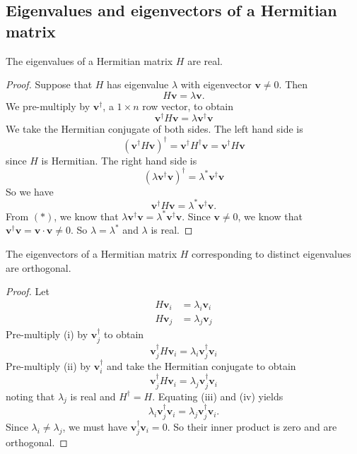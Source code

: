 \documentclass[a4paper]{article}
\begin{document}
      \subsection{Eigenvalues and eigenvectors of a Hermitian matrix}
      \begin{thm}
        The eigenvalues of a Hermitian matrix $H$ are real.
      \end{thm}

      \begin{proof}
        Suppose that $H$ has eigenvalue $\lambda$ with eigenvector $\mathbf{v}\not= 0$. Then
        \[
          H\mathbf{v} = \lambda\mathbf{v}.
        \]
        We pre-multiply by $\mathbf{v}^\dagger$, a $1\times n$ row vector, to obtain
        \[
        \mathbf{v}^\dagger H\mathbf{v} = \lambda \mathbf{v}^\dagger \mathbf{v}\tag{$*$}\]
        We take the Hermitian conjugate of both sides. The left hand side is
        \[
          (\mathbf{v}^\dagger H\mathbf{v})^\dagger = \mathbf{v}^\dagger H^\dagger \mathbf{v} = \mathbf{v}^\dagger H \mathbf{v}
        \]
        since $H$ is Hermitian. The right hand side is
        \[
          (\lambda\mathbf{v}^\dagger\mathbf{v})^\dagger = \lambda^* \mathbf{v}^\dagger \mathbf{v}
        \]
        So we have
        \[
          \mathbf{v}^\dagger H\mathbf{v} = \lambda^* \mathbf{v}^\dagger \mathbf{v}.
        \]
        From $(*)$, we know that $\lambda \mathbf{v}^\dagger \mathbf{v} = \lambda^* \mathbf{v}^\dagger \mathbf{v}$. Since $\mathbf{v} \not= 0$, we know that $\mathbf{v}^\dagger \mathbf{v} = \mathbf{v}\cdot \mathbf{v} \not =0$. So $\lambda = \lambda^*$ and $\lambda$ is real.
      \end{proof}

      \begin{thm}
        The eigenvectors of a Hermitian matrix $H$ corresponding to distinct eigenvalues are orthogonal. 
      \end{thm}

      \begin{proof}
        Let
        \begin{align*}
          H\mathbf{v}_i &= \lambda_i\mathbf{v}_i\tag{i}\\
          H\mathbf{v}_j &= \lambda_j\mathbf{v}_j\tag{ii}
        \end{align*}
        Pre-multiply (i) by $\mathbf{v}_j^\dagger$ to obtain
        \[
          \mathbf{v}_j^\dagger H\mathbf{v}_i = \lambda_i \mathbf{v}_j^\dagger \mathbf{v}_i\tag{iii}
        \]
        Pre-multiply (ii) by $\mathbf{v}_i^\dagger$ and take the Hermitian conjugate to obtain
        \[
          \mathbf{v}_j^\dagger H\mathbf{v}_i = \lambda_j \mathbf{v}_j^\dagger \mathbf{v}_i\tag{iv}
        \]
        noting that $\lambda_j$ is real and $H^\dagger =H$. Equating (iii) and (iv) yields
        \[
          \lambda_i \mathbf{v}_j^\dagger \mathbf{v}_i = \lambda_j \mathbf{v}_j^\dagger \mathbf{v}_i.
        \]
        Since $\lambda_i\not= \lambda_j$, we must have $\mathbf{v}_j^\dagger\mathbf{v}_i = 0$. So their inner product is zero and are orthogonal. 
      \end{proof}
\end{document}
